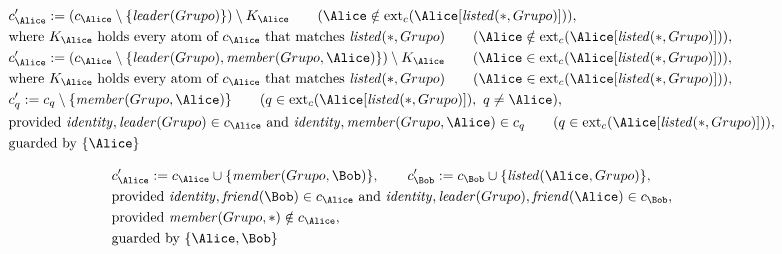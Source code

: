 \begin{align*}
&
c'_
{
\Alice
}
 := 
(c_
{
\Alice
}
 \setminus 
\{
\mathit{\detokenize{
leader
}}
(
Grupo
)
\}
) \setminus K_
{
\Alice
}
 \qquad (
\Alice
 \notin 
\mathrm{ext}_c(
\Alice
[
\mathit{\detokenize{
listed
}}
(
\ast
,
Grupo
)
]
)
)
,\\
&
\text{where } K_
{
\Alice
}
 \text{ holds every atom of } c_
{
\Alice
}
 \text{ that matches } 
\mathit{\detokenize{
listed
}}
(
\ast
,
Grupo
)
 \qquad (
\Alice
 \notin 
\mathrm{ext}_c(
\Alice
[
\mathit{\detokenize{
listed
}}
(
\ast
,
Grupo
)
]
)
)
,\\
&
c'_
{
\Alice
}
 := 
(c_
{
\Alice
}
 \setminus 
\{
\mathit{\detokenize{
leader
}}
(
Grupo
)
,
\mathit{\detokenize{
member
}}
(
Grupo
,
\Alice
)
\}
) \setminus K_
{
\Alice
}
 \qquad (
\Alice
 \in 
\mathrm{ext}_c(
\Alice
[
\mathit{\detokenize{
listed
}}
(
\ast
,
Grupo
)
]
)
)
,\\
&
\text{where } K_
{
\Alice
}
 \text{ holds every atom of } c_
{
\Alice
}
 \text{ that matches } 
\mathit{\detokenize{
listed
}}
(
\ast
,
Grupo
)
 \qquad (
\Alice
 \in 
\mathrm{ext}_c(
\Alice
[
\mathit{\detokenize{
listed
}}
(
\ast
,
Grupo
)
]
)
)
,\\
&
c'_
q
 := 
c_
q
 \setminus 
\{
\mathit{\detokenize{
member
}}
(
Grupo
,
\Alice
)
\}
 \qquad (
q
 \in 
\mathrm{ext}_c(
\Alice
[
\mathit{\detokenize{
listed
}}
(
\ast
,
Grupo
)
]
)
,\ 
q \neq 
\Alice
)
,\\
&
\text{provided } 
\mathit{\detokenize{
identity
}}
,
\mathit{\detokenize{
leader
}}
(
Grupo
)
 \in c_
{
\Alice
}
 \text{ and } 
\mathit{\detokenize{
identity
}}
,
\mathit{\detokenize{
member
}}
(
Grupo
,
\Alice
)
 \in c_
q
 \qquad (
q \in 
\mathrm{ext}_c(
\Alice
[
\mathit{\detokenize{
listed
}}
(
\ast
,
Grupo
)
]
)
)
,\\
&
\text{guarded by } \{
\Alice
\}
\end{align*}

\begin{align*}
&
c'_
{
\Alice
}
 := 
c_
{
\Alice
}
 \cup 
\{
\mathit{\detokenize{
member
}}
(
Grupo
,
\Bob
)
\}
, \qquad 
c'_
{
\Bob
}
 := 
c_
{
\Bob
}
 \cup 
\{
\mathit{\detokenize{
listed
}}
(
\Alice
,
Grupo
)
\}
,\\
&
\text{provided } 
\mathit{\detokenize{
identity
}}
,
\mathit{\detokenize{
friend
}}
(
\Bob
)
 \in c_
{
\Alice
}
 \text{ and } 
\mathit{\detokenize{
identity
}}
,
\mathit{\detokenize{
leader
}}
(
Grupo
)
,
\mathit{\detokenize{
friend
}}
(
\Alice
)
 \in c_
{
\Bob
}
,\\
&
\text{provided } 
\mathit{\detokenize{
member
}}
(
Grupo
,
\ast
)
 \notin c_
{
\Alice
}
,\\
&
\text{guarded by } \{
\Alice
,
\Bob
\}
\end{align*}
